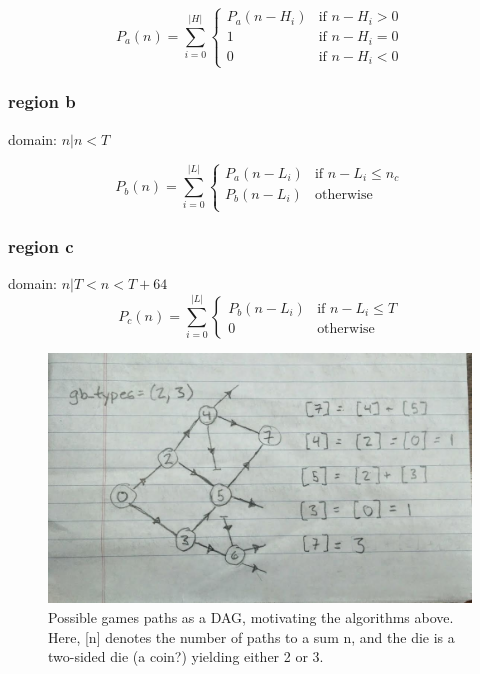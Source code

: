 \documentclass[a4paper, 11pt]{article}
\begin{document}
\[
	P_a(n) = \sum_{i=0}^{\vert H \vert}
		\begin{cases}
			P_a(n - H_i)	& \text{if $n - H_i > 0$} \\
			1		& \text{if $n - H_i = 0$} \\
			0		& \text{if $n - H_i < 0$}
		 \end{cases}
\]

\subsubsection{region b}
domain: $n \vert n < T$

\[
	P_b(n) = \sum_{i=0}^{\vert L \vert}
		\begin{cases}
			P_a(n - L_i)	& \text{if $n - L_i \leq n_c$} \\
			P_b(n - L_i)	& \text{otherwise} \\
		 \end{cases}
\]

\subsubsection{region c}
domain: $n \vert T < n < T + 64$
\[
	P_c(n) = \sum_{i=0}^{\vert L \vert}
		\begin{cases}
			P_b(n - L_i)	& \text{if $n - L_i \leq T$} \\
			0		& \text{otherwise}
			
		 \end{cases}
\]



\begin{figure}[H]
  \centering
  \includegraphics[scale=.3]{diagram.jpg}
  \caption{Possible games paths as a DAG, motivating the algorithms above. Here, [n] denotes the number of paths to a sum n, and the die is a two-sided die (a coin?) yielding either 2 or 3.}
\end{figure}
\end{document}
